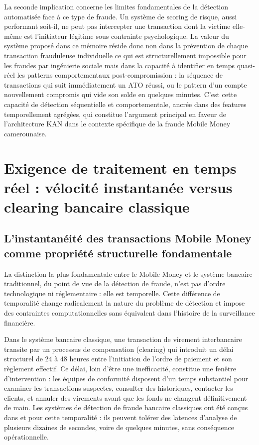 \documentclass[11pt,a4paper,oneside]{report}
\theoremstyle{definition}
\theoremstyle{remark}
\begin{document}
La seconde implication concerne les limites fondamentales de la détection automatisée face à ce type de fraude. Un système de scoring de risque, aussi performant soit-il, ne peut pas intercepter une transaction dont la victime elle-même est l'initiateur légitime sous contrainte psychologique. La valeur du système proposé dans ce mémoire réside donc non dans la prévention de chaque transaction frauduleuse individuelle  ce qui est structurellement impossible pour les fraudes par ingénierie sociale  mais dans la capacité à identifier en temps quasi-réel les patterns comportementaux post-compromission : la séquence de transactions qui suit immédiatement un ATO réussi, ou le pattern d'un compte nouvellement compromis qui vide son solde en quelques minutes. C'est cette capacité de détection séquentielle et comportementale, ancrée dans des features temporellement agrégées, qui constitue l'argument principal en faveur de l'architecture KAN dans le contexte spécifique de la fraude Mobile Money camerounaise.

\section{Exigence de traitement en temps réel : vélocité instantanée versus clearing bancaire classique}

\subsection{L'instantanéité des transactions Mobile Money comme propriété structurelle fondamentale}

La distinction la plus fondamentale entre le Mobile Money et le système bancaire traditionnel, du point de vue de la détection de fraude, n'est pas d'ordre technologique ni réglementaire : elle est temporelle. Cette différence de temporalité change radicalement la nature du problème de détection et impose des contraintes computationnelles sans équivalent dans l'histoire de la surveillance financière.

Dans le système bancaire classique, une transaction de virement interbancaire transite par un processus de compensation (clearing) qui introduit un délai structurel de 24 à 48 heures entre l'initiation de l'ordre de paiement et son règlement effectif. Ce délai, loin d'être une inefficacité, constitue une fenêtre d'intervention : les équipes de conformité disposent d'un temps substantiel pour examiner les transactions suspectes, consulter des historiques, contacter les clients, et annuler des virements avant que les fonds ne changent définitivement de main. Les systèmes de détection de fraude bancaire classiques ont été conçus dans et pour cette temporalité : ils peuvent tolérer des latences d'analyse de plusieurs dizaines de secondes, voire de quelques minutes, sans conséquence opérationnelle.
\end{document}
